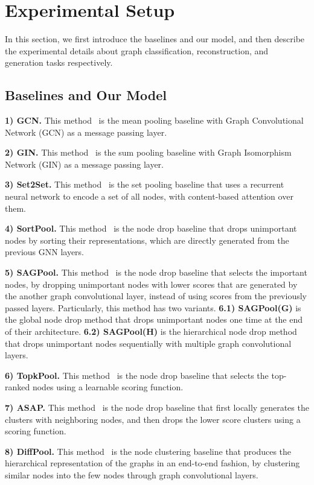 \documentclass{article} \usepackage{iclr2021_conference,times}
\begin{document}
\section{Experimental Setup}
In this section, we first introduce the baselines and our model, and then describe the experimental details about graph classification, reconstruction, and generation tasks respectively.


\subsection{Baselines and Our Model \label{appendix/classification/model}}
\textbf{1) GCN.} This method~\citep{GCN} is the mean pooling baseline with Graph Convolutional Network (GCN) as a message passing layer.

\textbf{2) GIN.} This method~\citep{GIN} is the sum pooling baseline with Graph Isomorphism Network (GIN) as a message passing layer.

\textbf{3) Set2Set.} This method~\citep{Set2Set} is the set pooling baseline that uses a recurrent neural network to encode a set of all nodes, with content-based attention over them.

\textbf{4) SortPool.} This method~\citep{SortPool} is the node drop baseline that drops unimportant nodes by sorting their representations, which are directly generated from the previous GNN layers.

\textbf{5) SAGPool.} This method~\citep{SAGPool} is the node drop baseline that selects the important nodes, by dropping unimportant nodes with lower scores that are generated by the another graph convolutional layer, instead of using scores from the previously passed layers. Particularly, this method has two variants. \textbf{6.1) SAGPool(G)} is the global node drop method that drops unimportant nodes one time at the end of their architecture. \textbf{6.2) SAGPool(H)} is the hierarchical node drop method that drops unimportant nodes sequentially with multiple graph convolutional layers.  

\textbf{6) TopkPool.} This method~\citep{TopKPool} is the node drop baseline that selects the top-ranked nodes using a learnable scoring function.

\textbf{7) ASAP.} This method~\citep{ASAP} is the node drop baseline that first locally generates the clusters with neighboring nodes, and then drops the lower score clusters using a scoring function.

\textbf{8) DiffPool.} This method~\citep{DiffPool} is the node clustering baseline that produces the hierarchical representation of the graphs in an end-to-end fashion, by clustering similar nodes into the few nodes through graph convolutional layers. 
\end{document}
